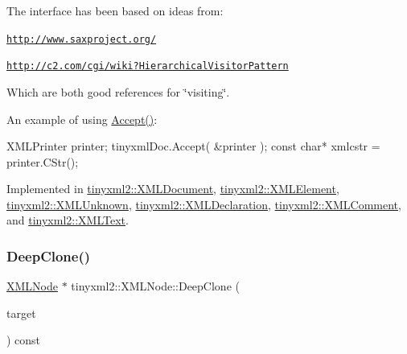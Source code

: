The interface has been based on ideas from\+:


\begin{DoxyItemize}
\item \href{http://www.saxproject.org/}{\tt http\+://www.\+saxproject.\+org/}
\item \href{http://c2.com/cgi/wiki?HierarchicalVisitorPattern}{\tt http\+://c2.\+com/cgi/wiki?\+Hierarchical\+Visitor\+Pattern}
\end{DoxyItemize}

Which are both good references for \char`\"{}visiting\char`\"{}.

An example of using \mbox{\hyperlink{classtinyxml2_1_1_x_m_l_node_a81e66df0a44c67a7af17f3b77a152785}{Accept()}}\+: \begin{DoxyVerb}XMLPrinter printer;
tinyxmlDoc.Accept( &printer );
const char* xmlcstr = printer.CStr();
\end{DoxyVerb}
 

Implemented in \mbox{\hyperlink{classtinyxml2_1_1_x_m_l_document_ab7be651917a35ab1ff0e4e6d4e565cdf}{tinyxml2\+::\+X\+M\+L\+Document}}, \mbox{\hyperlink{classtinyxml2_1_1_x_m_l_element_a9b2119831e8b85827d5d3e5076788e4a}{tinyxml2\+::\+X\+M\+L\+Element}}, \mbox{\hyperlink{classtinyxml2_1_1_x_m_l_unknown_a8a06b8c82117ca969a432e17a46830fc}{tinyxml2\+::\+X\+M\+L\+Unknown}}, \mbox{\hyperlink{classtinyxml2_1_1_x_m_l_declaration_acf47629d9fc08ed6f1c164a97bcf794b}{tinyxml2\+::\+X\+M\+L\+Declaration}}, \mbox{\hyperlink{classtinyxml2_1_1_x_m_l_comment_a27b37d16cea01b5329dfbbb4f9508e39}{tinyxml2\+::\+X\+M\+L\+Comment}}, and \mbox{\hyperlink{classtinyxml2_1_1_x_m_l_text_a537c60d7e18fb59c45ac2737a29ac47a}{tinyxml2\+::\+X\+M\+L\+Text}}.

\mbox{\label{classtinyxml2_1_1_x_m_l_node_a3bb369fd733f1989b751d99a9417adab}} 
\subsubsection{\texorpdfstring{Deep\+Clone()}{DeepClone()}}
{\footnotesize\ttfamily \mbox{\hyperlink{classtinyxml2_1_1_x_m_l_node}{X\+M\+L\+Node}} $\ast$ tinyxml2\+::\+X\+M\+L\+Node\+::\+Deep\+Clone (\begin{DoxyParamCaption}\item[{\mbox{\hyperlink{classtinyxml2_1_1_x_m_l_document}{X\+M\+L\+Document}} $\ast$}]{target }\end{DoxyParamCaption}) const}

